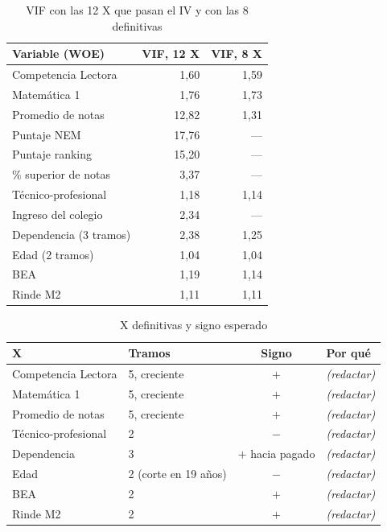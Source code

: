 \documentclass[11pt]{article}
\begin{document}
\begin{table}[H]
\centering
\caption{VIF con las 12 X que pasan el IV y con las 8 definitivas}
\label{tab:vif}
\begin{tabular}{l r r}
\toprule
\textbf{Variable (WOE)} & \textbf{VIF, 12 X} & \textbf{VIF, 8 X} \\
\midrule
Competencia Lectora & 1,60 & 1,59 \\
Matemática 1 & 1,76 & 1,73 \\
Promedio de notas & 12,82 & 1,31 \\
Puntaje NEM & 17,76 & --- \\
Puntaje ranking & 15,20 & --- \\
\% superior de notas & 3,37 & --- \\
Técnico-profesional & 1,18 & 1,14 \\
Ingreso del colegio & 2,34 & --- \\
Dependencia (3 tramos) & 2,38 & 1,25 \\
Edad (2 tramos) & 1,04 & 1,04 \\
BEA & 1,19 & 1,14 \\
Rinde M2 & 1,11 & 1,11 \\
\bottomrule
\end{tabular}
\end{table}

\begin{table}[H]
\centering
\caption{X definitivas y signo esperado}
\label{tab:signo}
\begin{tabular}{>{\raggedright}p{3.6cm} >{\raggedright}p{2.6cm} c >{\raggedright\arraybackslash}p{4.8cm}}
\toprule
\textbf{X} & \textbf{Tramos} & \textbf{Signo} & \textbf{Por qué} \\
\midrule
Competencia Lectora & 5, creciente & $+$ & \emph{(redactar)} \\
Matemática 1 & 5, creciente & $+$ & \emph{(redactar)} \\
Promedio de notas & 5, creciente & $+$ & \emph{(redactar)} \\
Técnico-profesional & 2 & $-$ & \emph{(redactar)} \\
Dependencia & 3 & $+$ hacia pagado & \emph{(redactar)} \\
Edad & 2 (corte en 19 años) & $-$ & \emph{(redactar)} \\
BEA & 2 & $+$ & \emph{(redactar)} \\
Rinde M2 & 2 & $+$ & \emph{(redactar)} \\
\bottomrule
\end{tabular}
\end{table}
\end{document}
